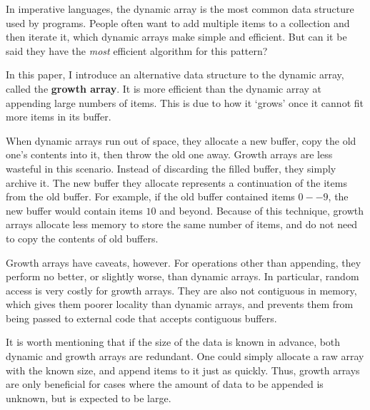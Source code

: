 In imperative languages, the dynamic array is the most common data structure used by programs. People often want to add multiple items to a collection and then iterate it, which dynamic arrays make simple and efficient. But can it be said they have the \textit{most} efficient algorithm for this pattern?

In this paper, I introduce an alternative data structure to the dynamic array, called the \textbf{growth array}. It is more efficient than the dynamic array at appending large numbers of items. This is due to how it `grows' once it cannot fit more items in its buffer.

When dynamic arrays run out of space, they allocate a new buffer, copy the old one's contents into it, then throw the old one away. Growth arrays are less wasteful in this scenario. Instead of discarding the filled buffer, they simply archive it. The new buffer they allocate represents a continuation of the items from the old buffer. For example, if the old buffer contained items $0 -- 9$, the new buffer would contain items $10$ and beyond. Because of this technique, growth arrays allocate less memory to store the same number of items, and do not need to copy the contents of old buffers.

Growth arrays have caveats, however. For operations other than appending, they perform no better, or slightly worse, than dynamic arrays. In particular, random access is very costly for growth arrays. They are also not contiguous in memory, which gives them poorer locality than dynamic arrays, and prevents them from being passed to external code that accepts contiguous buffers.

It is worth mentioning that if the size of the data is known in advance, both dynamic and growth arrays are redundant. One could simply allocate a raw array with the known size, and append items to it just as quickly. Thus, growth arrays are only beneficial for cases where the amount of data to be appended is unknown, but is expected to be large.